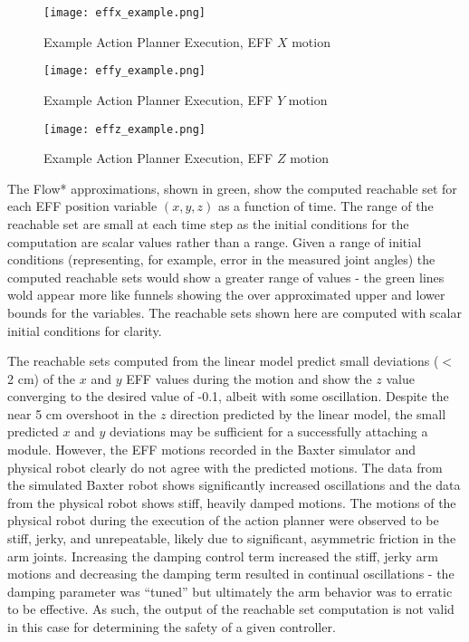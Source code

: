 \begin{figure}[h]
	\texttt{[image: effx\_example.png]}
	\caption{Example Action Planner Execution, EFF $X$ motion}
	\label{fig:effX}
\end{figure}

\begin{figure}[h]
	\texttt{[image: effy\_example.png]}
	\caption{Example Action Planner Execution, EFF $Y$ motion}
	\label{fig:effY}
\end{figure}

\begin{figure}[h]
	\texttt{[image: effz\_example.png]}
	\caption{Example Action Planner Execution, EFF $Z$ motion}
	\label{fig:effZ}
\end{figure}

The Flow* approximations, shown in green, show the computed reachable set for each EFF position variable $(x,y,z)$ as a function of time.
The range of the reachable set are small at each time step as the initial conditions for the computation are scalar values rather than a range.
Given a range of initial conditions (representing, for example, error in the measured joint angles) the computed reachable sets would show a greater range of values - the green lines wold appear more like funnels showing the over approximated upper and lower bounds for the variables.
The reachable sets shown here are computed with scalar initial conditions for clarity.

The reachable sets computed from the linear model predict small deviations ($<$ 2 cm) of the $x$ and $y$ EFF values during the motion and show the $z$ value converging to the desired value of -0.1, albeit with some oscillation.
Despite the near 5 cm overshoot in the $z$ direction predicted by the linear model, the small predicted $x$ and $y$ deviations may be sufficient for a successfully attaching a module.
However, the EFF motions recorded in the Baxter simulator and physical robot clearly do not agree with the predicted motions.
The data from the simulated Baxter robot shows significantly increased oscillations and the data from the physical robot shows stiff, heavily damped motions.
The motions of the physical robot during the execution of the action planner were observed to be stiff, jerky, and unrepeatable, likely due to significant, asymmetric friction in the arm joints.
Increasing the damping control term increased the stiff, jerky arm motions and decreasing the damping term resulted in continual oscillations - the damping parameter was ``tuned'' but ultimately the arm behavior was to erratic to be effective.
As such, the output of the reachable set computation is not valid in this case for determining the safety of a given controller.


